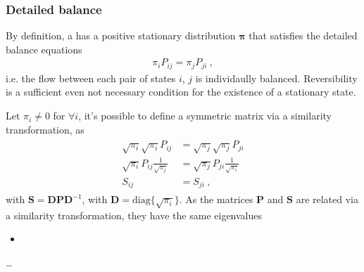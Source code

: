 \documentclass[letterpaper,10pt,english]{jupyterBook}
\begin{document}
\subsubsection{Detailed balance}
\label{\detokenize{ch/statistical-mechanics/markov-process-notes:detailed-balance}}\label{\detokenize{ch/statistical-mechanics/markov-process-notes:statistical-mechanics-markov-process-properties-detailed-balance}}
\sphinxAtStartPar
By definition, a  has a positive stationary distribution \(\boldsymbol\pi\) that satisfies the detailed balance equations
\begin{equation*}
\begin{split}\pi_i P_{ij} = \pi_j P_{ji} \ ,\end{split}
\end{equation*}
\sphinxAtStartPar
i.e. the flow between each pair of states \(i\), \(j\) is individaully balanced. Reversibility is a sufficient \sphinxhyphen{} even not necessary \sphinxhyphen{} condition for the existence of a stationary state.

\sphinxAtStartPar
Let \(\pi_i \ne 0\) for \(\forall i\), it’s possible to define a symmetric matrix via a similarity transformation, as
\begin{equation*}
\begin{split}\begin{aligned}
  \sqrt{\pi_i}\sqrt{\pi_i} P_{ij} & = \sqrt{\pi_j}\sqrt{\pi_j} P_{ji} \\
  \sqrt{\pi_i} P_{ij} \frac{1}{\sqrt{\pi_j}} & = \sqrt{\pi_j} P_{ji} \frac{1}{\sqrt{\pi_i}} \\
  S_{ij} & = S_{ji} \ ,
\end{aligned}\end{split}
\end{equation*}
\sphinxAtStartPar
with \(\mathbf{S} = \mathbf{D} \mathbf{P} \mathbf{D}^{-1}\), with \(\mathbf{D} = \text{diag}\{ \sqrt{\pi_i} \}\). As the matrices \(\mathbf{P}\) and \(\mathbf{S}\) are related via a similarity transformation, they have the same eigenvalues

\sphinxAtStartPar
{}
\begin{itemize}
\item {} 
\sphinxAtStartPar
{}

\end{itemize}

\sphinxAtStartPar
{} … 
\end{document}
